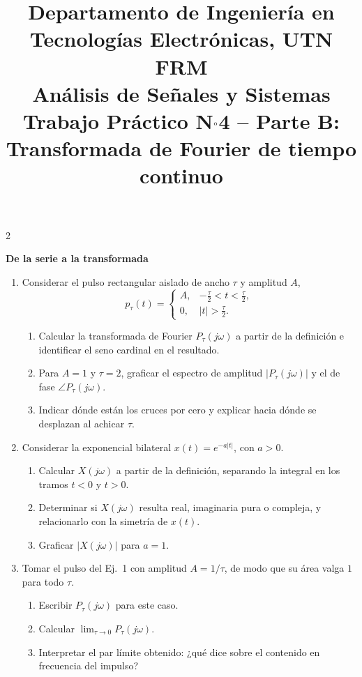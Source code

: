 \documentclass[10pt,a4paper]{article}
\title{%
	{\normalsize Departamento de Ingeniería en Tecnologías Electrónicas, UTN FRM}\\[0.1cm]
	{\large Análisis de Señales y Sistemas}\\[0.15cm]
	{\normalsize Trabajo Práctico N$^{\text o}$4 -- Parte B: Transformada de Fourier de tiempo continuo}%
}
\author{}
\date{}
\begin{document}
	\maketitle
	\thispagestyle{fancy}

	\begin{multicols}{2}

		\label{sec:enun}
			\textbf{De la serie a la transformada}
			\begin{enumerate}
			\item Considerar el pulso rectangular aislado de ancho $\tau$ y amplitud $A$,
			\[
				p_\tau(t) =
				\begin{cases}
					A, & -\tfrac{\tau}{2} < t < \tfrac{\tau}{2}, \\
					0, & |t| > \tfrac{\tau}{2}.
				\end{cases}
			\]
			\begin{enumerate}
				\item Calcular la transformada de Fourier $P_\tau(j\omega)$ a partir de la definición e identificar el seno cardinal en el resultado.
				\item Para $A=1$ y $\tau=2$, graficar el espectro de amplitud $|P_\tau(j\omega)|$ y el de fase $\angle P_\tau(j\omega)$.
				\item Indicar dónde están los cruces por cero y explicar hacia dónde se desplazan al achicar $\tau$.
			\end{enumerate}

			\item Considerar la exponencial bilateral $x(t) = e^{-a|t|}$, con $a>0$.
			\begin{enumerate}
				\item Calcular $X(j\omega)$ a partir de la definición, separando la integral en los tramos $t<0$ y $t>0$.
				\item Determinar si $X(j\omega)$ resulta real, imaginaria pura o compleja, y relacionarlo con la simetría de $x(t)$.
				\item Graficar $|X(j\omega)|$ para $a=1$.
			\end{enumerate}

			\item Tomar el pulso del Ej.~1 con amplitud $A = 1/\tau$, de modo que su área valga $1$ para todo $\tau$.
			\begin{enumerate}
				\item Escribir $P_\tau(j\omega)$ para este caso.
				\item Calcular $\lim_{\tau\to 0} P_\tau(j\omega)$.
				\item Interpretar el par límite obtenido: ¿qué dice sobre el contenido en frecuencia del impulso?
			\end{enumerate}


\end{enumerate}
\end{multicols}
\end{document}
